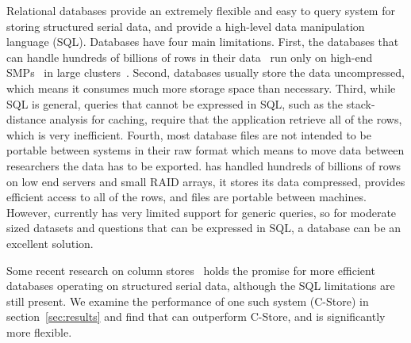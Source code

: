 Relational databases provide an extremely
flexible and easy to query system for storing 
structured serial data, and provide a high-level data manipulation
language (SQL). 
Databases have four main limitations.  First, the databases that can
handle hundreds of billions of rows in their data~\cite{winter2005}
run only on high-end SMPs~\cite{DaytonaInUse} in large
clusters~\cite{BigTable}. 
Second, databases usually store the data 
uncompressed, which means it consumes much more storage space than 
necessary.  Third, while SQL is general, queries that cannot be expressed
in SQL, such as the stack-distance analysis for caching, require that 
the application retrieve all of the rows, which is very inefficient.
Fourth, most database files are not intended to be portable between systems
in their raw format which means to move data between researchers the
data has to be exported.  \DataSeries{} has handled hundreds of billions 
of rows on low end servers and small RAID arrays, it stores its data
compressed, provides efficient access to all of the rows, and \DataSeries{}
files are portable between machines.  However, 
\DataSeries{} currently has very limited support for generic queries, so
for moderate sized datasets and questions that can be expressed in SQL, 
a database can be an excellent solution.

Some recent research on column stores~\cite{Stonebraker05} holds the promise
for more efficient databases operating on structured serial data, although the
SQL limitations are still present.  We examine the performance of one such
system (C-Store) in 
section~\ref{sec:results} and find that \DataSeries{} 
can outperform C-Store, and is significantly more flexible.


